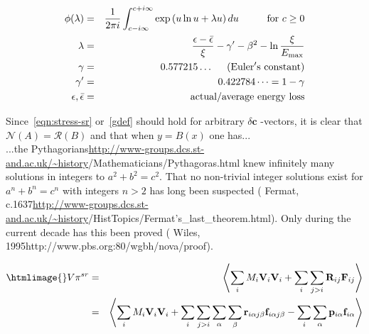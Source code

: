 \documentclass[a4paper,twoside]{article}
\providecommand{\Range}{\mathcal{R}}\providecommand{\Ker}{\mathcal{N}}
\newcommand{\StAndrews}{\url{http://www-groups.dcs.st-and.ac.uk/~history}}%
\newcommand{\Pythagorians}{\htmladdnormallink
 {Pythagorians}{\StAndrews/Mathematicians/Pythagoras.html}}
\newcommand{\Fermat}{\htmladdnormallink
 {Fermat, c.1637}{\StAndrews/HistTopics/Fermat's_last_theorem.html}}
\newcommand{\Wiles}{\htmladdnormallink
 {Wiles, 1995}{http://www.pbs.org:80/wgbh/nova/proof}}
\begin{document}
\begin{flushright}
\begin{makeimage}
\begin{eqnarray}
 \phi(\lambda) & = &  \frac{1} {2 \pi i}\int^{c+i\infty}_{c-i\infty}
  \exp \left( u \ln u + \lambda u \right ) du \hspace{1cm}\mbox{for } c \geq 0 \\
 \lambda       & = &  \frac{\epsilon  -\bar{\epsilon} }{\xi}
                   - \gamma' - \beta^2 - \ln \frac{\xi} {E_{\rm max}}          \\
 \gamma        & = &  0.577215\dots \mathrm{\hspace{5mm}(Euler's\ constant)}   \\
 \gamma'       & = &  0.422784\dots = 1 - \gamma                               \\
   \epsilon , \bar{\epsilon} & = & \mbox{actual/average energy loss}
\end{eqnarray}
\end{makeimage}
\end{flushright}

Since~\eqref{eqn:stress-sr} or~\eqref{gdef} should hold for arbitrary $\delta\bm{c}$%
-vectors, it is clear that $\Ker(A) = \Range(B)$ and that when $y=B(x)$ one has...\\
...the \Pythagorians{} knew infinitely many solutions in integers to $a^2+b^2=c^2$. 
That no non-trivial integer solutions exist for $a^n+b^n=c^n$ with integers $n>2$ has long 
been suspected (\Fermat). Only during the current decade has this been proved (\Wiles).

\begin{flushright}
\begin{eqnarray}\htmlimage{}
\label{eqn:stress-sr}
 V \bm{\pi}^{sr} & = & \left<  \sum_i M_i \bm{V}_i \bm{V}_i
  + \sum_i \sum_{j>i} \bm{R}_{ij} \bm{F}_{ij}\right> \\ \nonumber
                 & = & \left< \sum_i M_i \bm{V}_i \bm{V}_i
  + \sum_{i}\sum_{j>i}\sum_\alpha\sum_\beta \bm{r}_{i\alpha j\beta}\bm{f}_{i\alpha j\beta}
  - \sum_i \sum_\alpha \bm{p}_{i\alpha} \bm{f}_{i\alpha}   \right>
\end{eqnarray}
\end{flushright}
\end{document}
